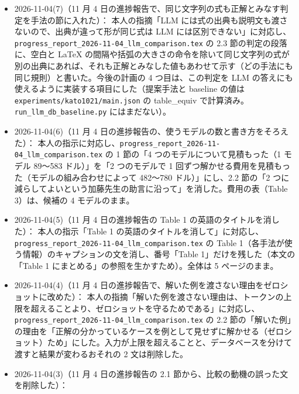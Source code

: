 \documentclass[11pt,a4paper]{jsarticle}
\begin{document}
\begin{itemize}[nosep]
    試験を 6 件足した（計 65 件）：規則がパイプラインの関数と一致すること、正解式 3{,}132 本のうち 386 本に別の出典の同じ式があること（報告書と同じ）、比べる相手の値が \texttt{experiments/kato1021/main.json} の table\_equiv と一致すること（全ケースの Recall@20 は提案手法 0.983、baseline 0.908）。LLM の答えがない状態で \texttt{evaluate3} が動くことも確かめた。有料の呼び出しはしていない。
  \item 2026-11-04(7)（11 月 4 日の進捗報告で、同じ文字列の式も正解とみなす判定を手法の節に入れた）：
    本人の指摘「LLM には式の出典も説明文も渡さないので、出典が違って形が同じ式は LLM には区別できない」に対応し、\texttt{progress\_report\_2026-11-04\_llm\_comparison.tex} の 2.3 節の判定の段落に、空白と \LaTeX{} の間隔や括弧の大きさの命令を除いて同じ文字列の式が別の出典にあれば、それも正解とみなした値もあわせて示す（どの手法にも同じ規則）と書いた。今後の計画の 4 つ目は、この判定を LLM の答えにも使えるように実装する項目にした（提案手法と baseline の値は \texttt{experiments/kato1021/main.json} の table\_equiv で計算済み。\texttt{run\_llm\_db\_baseline.py} にはまだない）。
  \item 2026-11-04(6)（11 月 4 日の進捗報告の、使うモデルの数と書き方をそろえた）：
    本人の指示に対応し、\texttt{progress\_report\_2026-11-04\_llm\_comparison.tex} の 1 節の「4 つのモデルについて見積もった（1 モデル 89〜583 ドル）」を「2 つのモデルで 1 回ずつ解かせる費用を見積もった（モデルの組み合わせによって 482〜780 ドル）」にし、2.2 節の「2 つに減らしてよいという加藤先生の助言に沿って」を消した。費用の表（Table 3）は、候補の 4 モデルのまま。
  \item 2026-11-04(5)（11 月 4 日の進捗報告の Table 1 の英語のタイトルを消した）：
    本人の指示「Table 1 の英語のタイトルを消して」に対応し、\texttt{progress\_report\_2026-11-04\_llm\_comparison.tex} の Table 1（各手法が使う情報）のキャプションの文を消し、番号「Table 1」だけを残した（本文の「Table 1 にまとめる」の参照を生かすため）。全体は 5 ページのまま。
  \item 2026-11-04(4)（11 月 4 日の進捗報告で、解いた例を渡さない理由をゼロショットに改めた）：
    本人の指摘「解いた例を渡さない理由は、トークンの上限を超えることより、ゼロショットを守るためである」に対応し、\texttt{progress\_report\_2026-11-04\_llm\_comparison.tex} の 2.2 節の「解いた例」の理由を「正解の分かっているケースを例として見せずに解かせる（ゼロショット）ため」にした。入力が上限を超えることと、データベースを分けて渡すと結果が変わるおそれの 2 文は削除した。
  \item 2026-11-04(3)（11 月 4 日の進捗報告の 2.1 節から、比較の動機の誤った文を削除した）：

\end{itemize}
\end{document}
